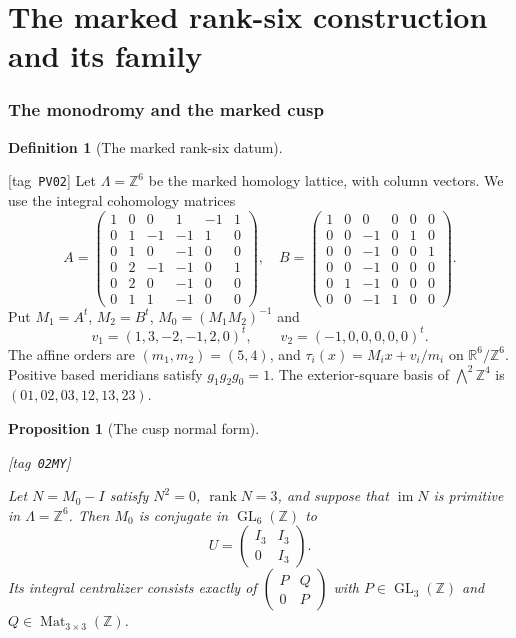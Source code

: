 \documentclass[11pt,a4paper]{article}
\numberwithin{equation}{section}
\newtheorem{proposition}[proposition]{Proposition}
\theoremstyle{definition}
\newtheorem{definition}[definition]{Definition}
\newcommand{\StatementRecord}[4]{{\upshape\footnotesize[tag~\texttt{#3}]}\enspace\ignorespaces}
\begin{document}
\clearpage
\part{The marked rank-six construction and its family}\label{pub:V:part-rank-six}
\section{The monodromy and the marked cusp}\label{pub:V:sec-local}

\begin{definition}[The marked rank-six datum]\hypertarget{tag-PV02}{}\label{pub:V:rank-six-data}\hypertarget{tag-034O}{}\label{sec:fourfold}
\StatementRecord{pub:V:rank-six-data}{proved}{PV02}{}
Let $\Lambda=\mathbb Z^6$ be the marked homology lattice, with column vectors. We use the integral cohomology matrices
\[
A=\begin{pmatrix}
1&0&0&1&-1&1\\0&1&-1&-1&1&0\\0&1&0&-1&0&0\\
0&2&-1&-1&0&1\\0&2&0&-1&0&0\\0&1&1&-1&0&0
\end{pmatrix},\quad
B=\begin{pmatrix}
1&0&0&0&0&0\\0&0&-1&0&1&0\\0&0&-1&0&0&1\\
0&0&-1&0&0&0\\0&1&-1&0&0&0\\0&0&-1&1&0&0
\end{pmatrix}.
\]
Put $M_1=A^t$, $M_2=B^t$, $M_0=(M_1M_2)^{-1}$ and
\[
 v_1=(1,3,-2,-1,2,0)^t,\qquad v_2=(-1,0,0,0,0,0)^t.
\]
The affine orders are $(m_1,m_2)=(5,4)$, and $\tau_i(x)=M_ix+v_i/m_i$ on $\mathbb R^6/\mathbb Z^6$.
Positive based meridians satisfy $g_1g_2g_0=1$. The exterior-square basis of $\bigwedge^2\mathbb Z^4$ is $(01,02,03,12,13,23)$.
\end{definition}

\begin{proposition}[The cusp normal form]\hypertarget{tag-02MY}{}\hypertarget{tag-02R7}{}\label{maps:src:F.2.1}
\StatementRecord{maps:src:F.2.1}{proved}{02MY}{the definitions and constructions stated in the proof}


Let $N=M_0-I$ satisfy $N^2=0$, $\operatorname{rank}N=3$,
and suppose that $\operatorname{im}N$ is primitive in
$\Lambda=\mathbb Z^6$. Then $M_0$ is conjugate in
$\operatorname{GL}_6(\mathbb Z)$ to
\[
 U=\begin{pmatrix}I_3&I_3\\0&I_3\end{pmatrix}.
\]
Its integral centralizer consists exactly of
$\left(\begin{smallmatrix}P&Q\\0&P\end{smallmatrix}\right)$
with $P\in\operatorname{GL}_3(\mathbb Z)$ and
$Q\in\operatorname{Mat}_{3\times3}(\mathbb Z)$.

\end{proposition}
\end{document}
